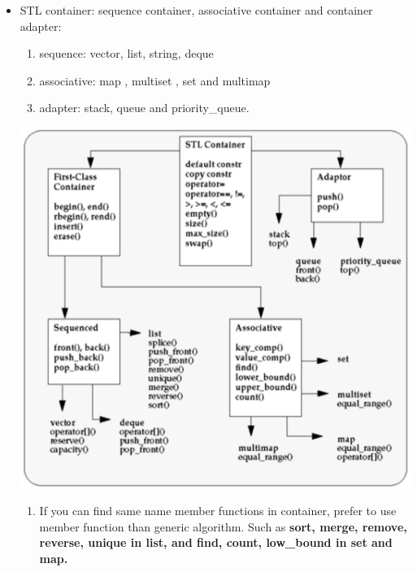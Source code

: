 \documentclass[a4paper,11pt,twoside]{book}
\begin{document}
\begin{itemize}

\item STL container: sequence container, associative container and container adapter:
\begin{enumerate}
\item sequence: vector, list, string,  deque
\item associative: map , multiset , set and multimap
\item adapter: stack, queue and priority\_queue.
\end{enumerate}

\includegraphics[scale=0.6]{pics/container.png}

\begin{enumerate}
\item  If you can find same name member functions in container, prefer to use member function than generic algorithm. Such as \textbf{sort, merge, remove, reverse, unique in list, and find, count, low\_bound in set and map. }



\end{enumerate}
\end{itemize}
\end{document}

